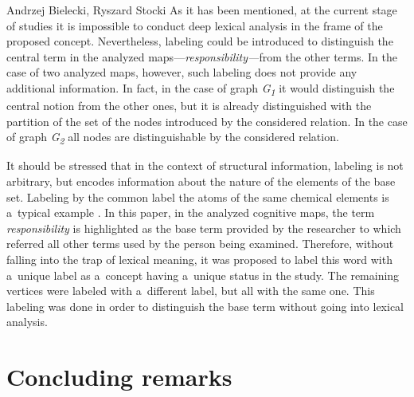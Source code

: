 \begin{artengenv2auth}{Andrzej Bielecki, Ryszard Stocki}
As it has been mentioned, at the current stage of studies it is impossible to conduct deep lexical analysis in the frame of the proposed concept. Nevertheless, labeling could be introduced to distinguish the central term in the analyzed maps---\textit{responsibility---}from the other terms. In the case of two analyzed maps, however, such labeling does not provide any additional information. In fact, in the case of graph \textit{G}\textit{\textsubscript{1}} it would distinguish the central notion from the other ones, but it is already distinguished with the partition of the set of the nodes introduced by the considered relation. In the case of graph \textit{G}\textit{\textsubscript{2}} all nodes are distinguishable by the considered relation.



It should be stressed that in the context of structural information, labeling is not arbitrary, but encodes information about the nature of the elements of the base set. Labeling by the common label the atoms of the same chemical elements is a~typical example 
\parencite[see][]{bielecki_information_2022}. %
 In this paper, in the analyzed cognitive maps, the term \textit{responsibility} is highlighted as the base term provided by the researcher to which referred all other terms used by the person being examined. Therefore, without falling into the trap of lexical meaning, it was proposed to label this word with a~unique label as a~concept having a~unique status in the study. The remaining vertices were labeled with a~different label, but all with the same one. This labeling was done in order to distinguish the base term without going into lexical analysis.



\section{Concluding remarks}


\end{artengenv2auth}
